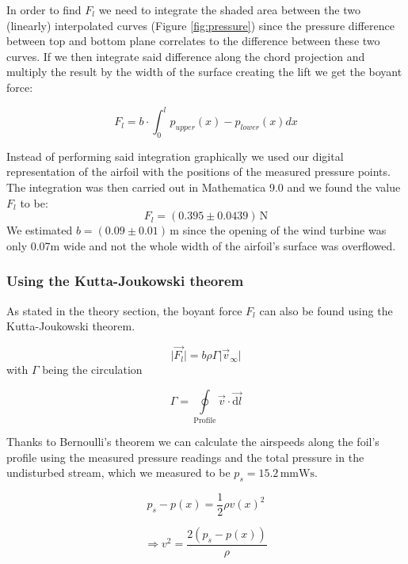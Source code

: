 \documentclass{scrreprt}
\newcommand{\unit}[1]{\ensuremath{\, \mathrm{#1}}}
\begin{document}
In order to find $F_l$ we need to integrate the shaded area between the two (linearly) interpolated curves (Figure \ref{fig:pressure}) since the pressure difference between top and bottom plane correlates to the difference between these two curves. If we then integrate said difference along the chord projection and multiply the result by the width of the surface creating the lift we get the boyant force:

\begin{equation}
F_l = b \cdot \int_0^l{p_{upper}(x)-p_{lower}(x)dx}
\end{equation}

Instead of performing said integration graphically we used our digital representation of the airfoil with the positions of the measured pressure points. The integration was then carried out in Mathematica 9.0 and we found the value $F_l$ to be:
\[F_l = (0.395 \pm 0.0439) \unit{N}\]
We estimated $b=(0.09 \pm 0.01)\unit{m}$ since the opening of the wind turbine was only 0.07m wide and not the whole width of the airfoil's surface was overflowed.

\subsubsection{Using the Kutta-Joukowski theorem}

As stated in the theory section, the boyant force $F_l$ can also be found using the Kutta-Joukowski theorem.

\begin{equation}
\lvert \vec{F_l}\rvert = b \rho \Gamma \lvert \vec{v}_\infty \rvert
\end{equation}
with $\Gamma$ being the circulation

\begin{equation}
\Gamma = \oint\limits_{\text{Profile}}\!\vec{v}\cdot\vec{\mathrm{d} l}\label{eq:integral}
\end{equation}

Thanks to Bernoulli's theorem we can calculate the airspeeds along the foil's profile using the measured pressure readings and the total pressure in the undisturbed stream, which we measured to be $p_s= 15.2 \unit{mmWs}$.

\begin{equation}
p_s - p(x) = \frac{1}{2} \rho v(x)^2
\end{equation}


\begin{equation}
\Longrightarrow v^2 = \frac{2\left(p_s-p(x)\right)}{\rho}
\end{equation}
\end{document}
